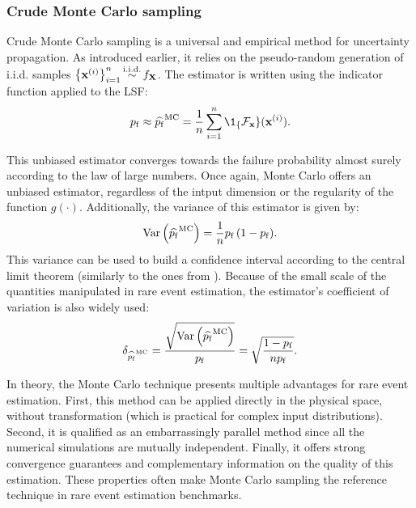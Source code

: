 \subsubsection{Crude Monte Carlo sampling}
Crude Monte Carlo sampling is a universal and empirical method for uncertainty propagation. 
As introduced earlier, it relies on the pseudo-random generation of i.i.d. samples $\left\{{\bf x}^{(i)}\right\}_{i=1}^n \mathop{\sim}\limits^{\mathrm{i.i.d.}} f_{\bf X}$.   
The estimator is written using the indicator function applied to the LSF: 
\begin{equation}
    \pf \approx \what{\pf}^{\textrm{MC}} = \frac1n \sum_{i=1}^{n} \1_\{\iF_\bx\}(\bx^{(i)}).
\end{equation} 

This unbiased estimator converges towards the failure probability almost surely according to the law of large numbers. 
Once again, Monte Carlo offers an unbiased estimator, regardless of the intput dimension or the regularity of the function $g(\cdot)$.   
Additionally, the variance of this estimator is given by:
\begin{equation}
    \operatorname{Var}\left(\widehat{p_\mathrm{f}}^{\textrm{MC}}\right) = \frac1n p_\mathrm{f} \, (1 - p_\mathrm{f}).
\end{equation} 
This variance can be used to build a confidence interval according to the central limit theorem (similarly to the ones from ). 
Because of the small scale of the quantities manipulated in rare event estimation, the estimator's coefficient of variation is also widely used: 
\begin{equation}
    \delta_{\widehat{p_\mathrm{f}}^{\textrm{MC}}} = \frac{\sqrt{\operatorname{Var}\left(\widehat{p_\mathrm{f}}^{\textrm{MC}}\right)}}{p_\mathrm{f}}
                                      = \sqrt{\frac{1 - p_\mathrm{f}}{n p_\mathrm{f}}}.
\end{equation}

In theory, the Monte Carlo technique presents multiple advantages for rare event estimation. 
First, this method can be applied directly in the physical space, without transformation (which is practical for complex input distributions). 
Second, it is qualified as an embarrassingly parallel method since all the numerical simulations are mutually independent. 
Finally, it offers strong convergence guarantees and complementary information on the quality of this estimation. 
These properties often make Monte Carlo sampling the reference technique in rare event estimation benchmarks. 

